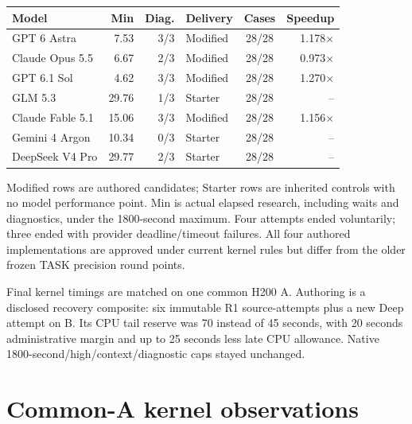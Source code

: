 \documentclass[11pt,letterpaper]{article}
\newcommand{\keypoint}[1]{\par\medskip\noindent\colorbox{pale}{\parbox{\dimexpr\linewidth-2\fboxsep\relax}{\vspace{5pt}#1\vspace{5pt}}}\par\medskip}
\begin{document}
\small\begin{tabularx}{\linewidth}{@{}Xrrlcr@{}}\toprule\textbf{Model} & \textbf{Min} & \textbf{Diag.} & \textbf{Delivery} & \textbf{Cases} & \textbf{Speedup}\\\midrule

GPT 6 Astra & 7.53 & 3/3 & Modified & 28/28 & 1.178$\times$\\

Claude Opus 5.5 & 6.67 & 2/3 & Modified & 28/28 & 0.973$\times$\\

GPT 6.1 Sol & 4.62 & 3/3 & Modified & 28/28 & 1.270$\times$\\

GLM 5.3 & 29.76 & 1/3 & Starter & 28/28 & --\\

Claude Fable 5.1 & 15.06 & 3/3 & Modified & 28/28 & 1.156$\times$\\

Gemini 4 Argon & 10.34 & 0/3 & Starter & 28/28 & --\\

DeepSeek V4 Pro & 29.77 & 2/3 & Starter & 28/28 & --\\

\bottomrule\end{tabularx}\normalsize

Modified rows are authored candidates; Starter rows are inherited controls with no model performance point. Min is actual elapsed research, including waits and diagnostics, under the 1800-second maximum. Four attempts ended voluntarily; three ended with provider deadline/timeout failures. All four authored implementations are approved under current kernel rules but differ from the older frozen TASK precision round points.

\keypoint{Final kernel timings are matched on one common H200 A. Authoring is a disclosed recovery composite: six immutable R1 source-attempts plus a new Deep attempt on B. Its CPU tail reserve was 70 instead of 45 seconds, with 20 seconds administrative margin and up to 25 seconds less late CPU allowance. Native 1800-second/high/context/diagnostic caps stayed unchanged.}

\section{Common-A kernel observations}
\end{document}
